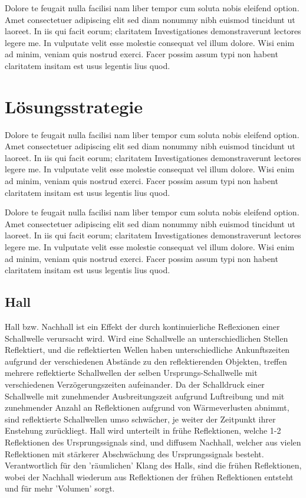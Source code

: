 \documentclass[a4paper,12pt,fontsize=12,DIV=12]{scrartcl}
\begin{document}
Dolore te feugait nulla facilisi nam liber tempor cum soluta nobis eleifend option. Amet consectetuer adipiscing elit sed diam nonummy nibh euismod tincidunt ut laoreet. In iis qui facit eorum; claritatem Investigationes demonstraverunt lectores legere me. In vulputate velit esse molestie consequat vel illum dolore. Wisi enim ad minim, veniam quis nostrud exerci. Facer possim assum typi non habent claritatem insitam est usus legentis lius quod.

\section{Lösungsstrategie}
Dolore te feugait nulla facilisi nam liber tempor cum soluta nobis eleifend option. Amet consectetuer adipiscing elit sed diam nonummy nibh euismod tincidunt ut laoreet. In iis qui facit eorum; claritatem Investigationes demonstraverunt lectores legere me. In vulputate velit esse molestie consequat vel illum dolore. Wisi enim ad minim, veniam quis nostrud exerci. Facer possim assum typi non habent claritatem insitam est usus legentis lius quod.

Dolore te feugait nulla facilisi nam liber tempor cum soluta nobis eleifend option. Amet consectetuer adipiscing elit sed diam nonummy nibh euismod tincidunt ut laoreet. In iis qui facit eorum; claritatem Investigationes demonstraverunt lectores legere me. In vulputate velit esse molestie consequat vel illum dolore. Wisi enim ad minim, veniam quis nostrud exerci. Facer possim assum typi non habent claritatem insitam est usus legentis lius quod.

\subsection{Hall}
Hall bzw. Nachhall ist ein Effekt der durch kontinuierliche Reflexionen einer Schallwelle verursacht wird.
Wird eine Schallwelle an unterschiedlichen Stellen Reflektiert, und die reflektierten Wellen haben unterschiedliche Ankunftszeiten aufgrund der verschiedenen Abstände zu den reflektierenden Objekten, treffen mehrere reflektierte Schallwellen der selben Ursprungs-Schallwelle mit verschiedenen Verzögerungszeiten aufeinander. Da der Schalldruck einer Schallwelle mit zunehmender Ausbreitungszeit aufgrund Luftreibung und mit zunehmender Anzahl an Reflektionen aufgrund von Wärmeverlusten abnimmt, sind reflektierte Schallwellen umso schwächer, je weiter der Zeitpunkt ihrer Enstehung zurückliegt.
Hall wird unterteilt in frühe Reflektionen, welche 1-2 Reflektionen des Ursprungssignals sind, und diffusem Nachhall, welcher aus vielen Reflektionen mit stärkerer Abschwächung des Ursprungssignals besteht. Verantwortlich für den 'räumlichen' Klang des Halls, sind die frühen Reflektionen, wobei der Nachhall wiederum aus Reflektionen der frühen Reflektionen entsteht und für mehr 'Volumen' sorgt.
\end{document}
